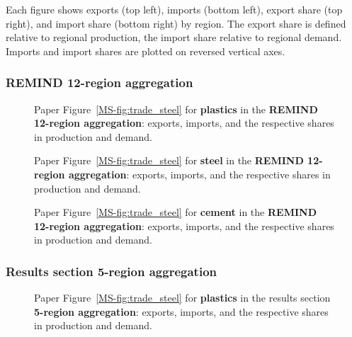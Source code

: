 Each figure shows exports (top left), imports (bottom left), export share (top right), and import share (bottom right) by region.
The export share is defined relative to regional production, the import share relative to regional demand.
Imports and import shares are plotted on reversed vertical axes.

\subsubsection{REMIND 12-region aggregation}

\begin{figure}[htbp]
    \centering
    \caption{Paper Figure~\ref{MS-fig:trade_steel} for \textbf{plastics} in the \textbf{REMIND 12-region aggregation}: exports, imports, and the respective shares in production and demand.}
    \label{fig:figure_7_plastics_h12}
\end{figure}

\begin{figure}[htbp]
    \centering
    \caption{Paper Figure~\ref{MS-fig:trade_steel} for \textbf{steel} in the \textbf{REMIND 12-region aggregation}: exports, imports, and the respective shares in production and demand.}
    \label{fig:figure_7_steel_h12}
\end{figure}

\begin{figure}[htbp]
    \centering
    \caption{Paper Figure~\ref{MS-fig:trade_steel} for \textbf{cement} in the \textbf{REMIND 12-region aggregation}: exports, imports, and the respective shares in production and demand.}
    \label{fig:figure_7_cement_h12}
\end{figure}

\clearpage
\subsubsection{Results section 5-region aggregation}

\begin{figure}[htbp]
    \centering
    \caption{Paper Figure~\ref{MS-fig:trade_steel} for \textbf{plastics} in the results section \textbf{5-region aggregation}: exports, imports, and the respective shares in production and demand.}
    \label{fig:figure_7_plastics_agg5}
\end{figure}

